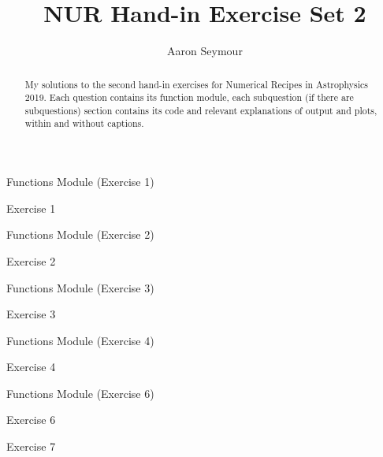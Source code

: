 \documentclass[a4paper,10pt]{article}
\title{NUR Hand-in Exercise Set 2}
\author{Aaron Seymour}
\begin{document}
\maketitle

\begin{abstract}
 My solutions to the second hand-in exercises for Numerical Recipes in Astrophysics 2019. Each question contains its function module, each subquestion (if there are subquestions) section contains its code and relevant explanations of output and plots, within and without captions.
\end{abstract}


\begin{section}{Functions Module (Exercise 1)}

\end{section}

\begin{section}{Exercise 1}

\end{section}


\FloatBarrier
\begin{section}{Functions Module (Exercise 2)}

\end{section}

\begin{section}{Exercise 2}

\end{section}


\FloatBarrier
\begin{section}{Functions Module (Exercise 3)}

\end{section}

\begin{section}{Exercise 3}

\end{section}


\FloatBarrier
\begin{section}{Functions Module (Exercise 4)}

\end{section}

\begin{section}{Exercise 4}

\end{section}


\FloatBarrier
\begin{section}{Functions Module (Exercise 6)}

\end{section}

\begin{section}{Exercise 6}

\end{section}


\FloatBarrier
\begin{section}{Exercise 7}

\end{section}
  
\end{document}
